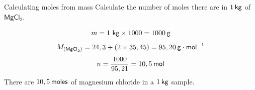    \noindent
  \vspace{-.3cm}
            \label{m38717*secfhsst!!!underscore!!!id641}\vspace{.5cm}  
      \begin{wex}{Calculating moles from mass }
{
      \label{m38717*id278755}Calculate the number of moles there are in $1\phantom{\rule{2pt}{0ex}}\mathsf{kg}$ of $\mathsf{MgCl}{}_{2}$.
      \vspace{5pt}}
{


\label{m38717*id278854}\nopagebreak\noindent{}
    \begin{equation*}
    m=1~\mathsf{kg}\ensuremath{\times}1 000=1 000\phantom{\rule{2pt}{0ex}}\mathsf{g}
      \end{equation*}
\label{m38717*id278912}\nopagebreak\noindent{}
    \begin{equation*}
    {M}_{\left({\mathsf{MgCl}}_{2}\right)}=24,3 + \left(2\ensuremath{\times}35,45\right) = 95,20\phantom{\rule{2pt}{0ex}}\mathsf{g}\ensuremath{\cdot}{\mathsf{mol}}^{-1}
      \end{equation*}    
      \label{m38717*id279005}\nopagebreak\noindent{}
    \begin{equation*}
    n=\frac{1000}{95,21}=10,5\phantom{\rule{2pt}{0ex}}\mathsf{mol}
      \end{equation*}
      \label{m38717*id279046}There are $10,5\phantom{\rule{2pt}{0ex}}\mathsf{moles}$ of magnesium chloride in a $1\phantom{\rule{2pt}{0ex}}\mathsf{kg}$ sample.
}
    \end{wex}
\label{m38717*secfhsst!!!underscore!!!id832}
